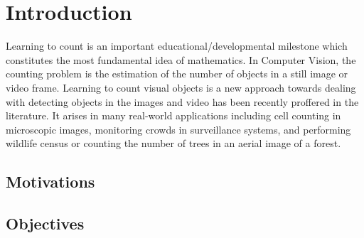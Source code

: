 \chapter{Introduction}
\label{sec:introduction}




Learning to count is an important educational/developmental milestone which constitutes the most fundamental idea of mathematics. In Computer Vision, the counting problem is the estimation of the number of objects in a still image or video frame. Learning to count visual objects is a new approach towards dealing with detecting objects in the images and video has been recently proffered in the literature. It arises in many real-world applications including cell counting in microscopic images, monitoring crowds in surveillance systems, and performing wildlife census or counting the number of trees in an aerial image of a forest\cite{NIPS2010_4043}. 

\section{Motivations}
\section{Objectives}
